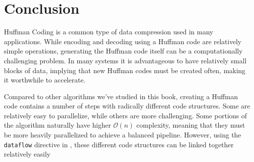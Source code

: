 \section{Conclusion}

Huffman Coding is a common type of data compression used in many applications.  While encoding and decoding using a Huffman code are relatively simple operations, generating the Huffman code itself can be a computationally challenging problem.  In many systems it is advantageous to have relatively small blocks of data, implying that new Huffman codes must be created often, making it worthwhile to accelerate.

Compared to other algorithms we've studied in this book, creating a Huffman code contains a number of steps with radically different code structures.  Some are relatively easy to parallelize, while others are more challenging.  Some portions of the algorithm naturally have higher $\mathcal{O}(n)$ complexity, meaning that they must be more heavily parallelized to achieve a balanced pipeline.  However, using the \lstinline{dataflow} directive in \VHLS, these different code structures can be linked together relatively easily